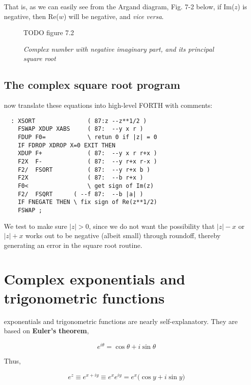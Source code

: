 That is, as we can easily see from the Argand diagram, Fig. 7-2 below, if Im($z$) is negative, then Re($w$) will be negative, and \textit{vice versa}.

\begin{figure}
    \center
    TODO figure 7.2
    \caption{\textit{Complex number with negative imaginary part, and its principal square root}}
    \label{fig:07_02}
\end{figure}

\subsection{The complex square root program}
 now translate these equations into high-level FORTH with comments:

\begin{lstlisting}
  : XSORT               ( 87:z --z**1/2 )
    FSWAP XDUP XABS     ( 87:  --y x r )
    FDUP F0=            \ retun 0 if |z| = 0
    IF FDROP XDROP X=0 EXIT THEN
    XDUP F+             ( 87:  --y x r r+x )
    F2X  F-             ( 87:  --y r+x r-x )
    F2/  FSORT          ( 87:  --y r+x b )
    F2X                 ( 87:  --b r+x )
    F0<                 \ get sign of Im(z)
    F2/  FSQRT      ( --f 87:  --b |a| )
    IF FNEGATE THEN \ fix sign of Re(z**1/2)
    FSWAP ;
\end{lstlisting}

We test to make sure $\lvert z \rvert > 0$, since we do not want the possibility that $\lvert z \rvert - x$ or $\lvert z \rvert + x$ works out to be negative (albeit small) through roundoff, thereby generating an error in the square root routine.

\section{Complex exponentials and trigonometric functions}
 exponentials and trigonometric functions are nearly self-explanatory. They are based on \textbf{Euler's theorem},

\begin{equation*}
  e^{i\theta} = \cos\theta + i \sin\theta
\end{equation*}

Thus,

\begin{equation}
  e^z \equiv e^{x + iy} \equiv e^x e^{iy} = e^x\big(\cos y + i \sin y\big)
\end{equation}

